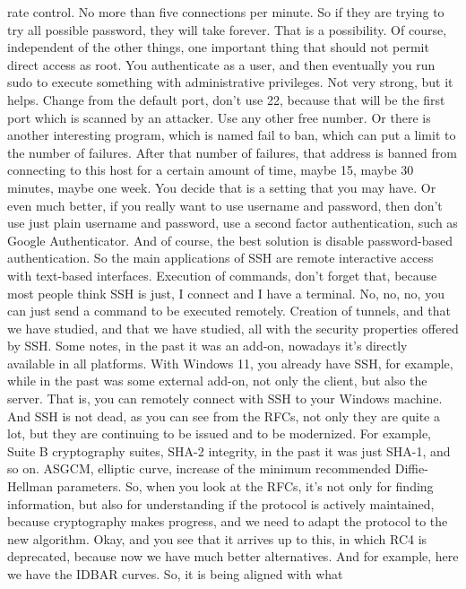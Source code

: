 rate control. No more than five connections per minute. So if they are trying
 to try all possible password, they will take forever. That is a possibility.
 Of course, independent of the other things, one important thing that should
 not permit direct access as root. You authenticate as a user, and then
 eventually you run sudo to execute something with administrative privileges.
 Not very strong, but it helps. Change from the default port, don't use 22,
 because that will be the first port which is scanned by an attacker. Use any
 other free number. Or there is another interesting program, which is named
 fail to ban, which can put a limit to the number of failures. After that
 number of failures, that address is banned from connecting to this host for a
 certain amount of time, maybe 15, maybe 30 minutes, maybe one week. You decide
 that is a setting that you may have. Or even much better, if you really want
 to use username and password, then don't use just plain username and password,
 use a second factor authentication, such as Google Authenticator. And of
 course, the best solution is disable password-based authentication. So the
 main applications of SSH are remote interactive access with text-based
 interfaces. Execution of commands, don't forget that, because most people
 think SSH is just, I connect and I have a terminal. No, no, no, you can just
 send a command to be executed remotely. Creation of tunnels, and that we have
 studied, and that we have studied, all with the security properties offered by
 SSH. Some notes, in the past it was an add-on, nowadays it's directly
 available in all platforms. With Windows 11, you already have SSH, for
 example, while in the past was some external add-on, not only the client, but
 also the server. That is, you can remotely connect with SSH to your Windows
 machine. And SSH is not dead, as you can see from the RFCs, not only they are
 quite a lot, but they are continuing to be issued and to be modernized. For
 example, Suite B cryptography suites, SHA-2 integrity, in the past it was just
 SHA-1, and so on. ASGCM, elliptic curve, increase of the minimum recommended
 Diffie-Hellman parameters. So, when you look at the RFCs, it's not only for
 finding information, but also for understanding if the protocol is actively
 maintained, because cryptography makes progress, and we need to adapt the
 protocol to the new algorithm. Okay, and you see that it arrives up to this,
 in which RC4 is deprecated, because now we have much better alternatives. And
 for example, here we have the IDBAR curves. So, it is being aligned with what
